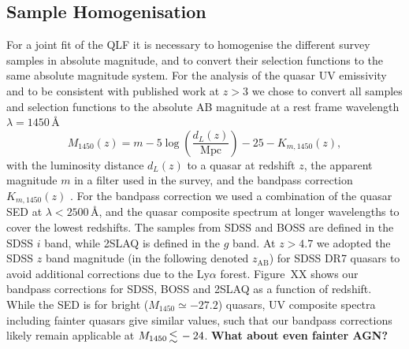 \documentclass[a4paper,fleqn,usenatbib]{mnras}
\begin{document}
\subsection{Sample Homogenisation}
\label{sect:datahom}

For a joint fit of the QLF it is necessary to homogenise the different
survey samples in absolute magnitude, and to convert their selection
functions to the same absolute magnitude system. For the analysis of
the quasar UV emissivity and to be consistent with published work at
$z>3$ we chose to convert all samples and selection functions to the
absolute AB magnitude at a rest frame wavelength $\lambda=1450$\,\AA
\begin{equation}\label{eq:absmag}
M_{1450}\left(z\right) = m-5\log{\left(\frac{d_L\left(z\right)}{\mathrm{Mpc}}\right)}-25-K_{m,1450}\left(z\right),
\end{equation}
with the luminosity distance $d_L\left(z\right)$ to a quasar at
redshift $z$, the apparent magnitude $m$ in a filter used in the
survey, and the bandpass correction $K_{m,1450}\left(z\right)$
\citep{1956AJ.....61...97H, 1968ApJ...154...21O, 2000A&A...353..861W,
  2002astro.ph.10394H}. For the bandpass correction we used a
combination of the \citet{2015MNRAS.449.4204L} quasar SED at
$\lambda<2500$\,\AA, and the \citet{2001AJ....122..549V} quasar
composite spectrum at longer wavelengths to cover the lowest
redshifts.  The samples from SDSS and BOSS are defined in the SDSS $i$
band, while 2SLAQ is defined in the $g$ band. At $z>4.7$ we adopted
the SDSS $z$ band magnitude (in the following denoted $z_\mathrm{AB}$)
for SDSS DR7 quasars to avoid additional corrections due to the
Ly$\alpha$ forest. Figure~XX shows our bandpass corrections for SDSS,
BOSS and 2SLAQ as a function of redshift. While the
\citet{2015MNRAS.449.4204L} SED is for bright ($M_{1450}\simeq -27.2$)
quasars, UV composite spectra including fainter quasars
\citep{2002ApJ...565..773T, 2012ApJ...752..162S, 2014ApJ...794...75S}
give similar values, such that our bandpass corrections likely remain
applicable at $M_{1450}\la -24$. \textbf{What about even fainter AGN?}
\end{document}

